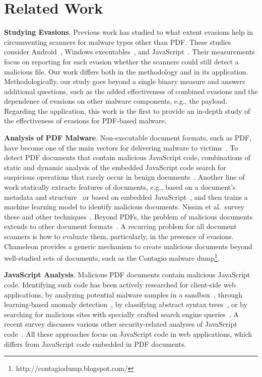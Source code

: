 \section{Related Work}
\label{ss: related work}

\textbf{Studying Evasions}.
Previous work has studied to what extent evasions help in circumventing scanners for malware types other than PDF.
These studies consider Android~\cite{zheng2012adam,faruki2014evaluation,rastogi2013droidchameleon,fedler2013effectiveness,petsas2014rage,canfora2015obfuscation}, Windows executables~\cite{christodorescu2004testing,moser2007limits}, and JavaScript~\cite{Xu2012a}.
Their measurements focus on reporting for each evasion whether the scanners could still detect a malicious file.
Our work differs both in the methodology and in its application.
Methodologically, our study goes beyond a single binary measure and answers additional questions, such as the added effectiveness of combined evasions and the dependence of evasions on other malware components, e.g., the payload.
Regarding the application, this work is the first to provide an in-depth study of the effectiveness of evasions for PDF-based malware.

\textbf{Analysis of PDF Malware}.
Non-executable document formats, such as PDF, have become one of the main vectors for delivering malware to victims~\cite{hardy2014targeted}.
To detect PDF documents that contain malicious JavaScript code, combinations of static and dynamic analysis of the embedded JavaScript code search for suspicious operations that rarely occur in benign documents~\cite{liu2014detecting,schmitt2012pdf,tzermias2011combining,lu2013obfuscation}.
Another line of work statically extracts features of documents, e.g., based on a document's metadata and structure~\cite{smutz2012malicious,maiorca2012pattern,vsrndic2013detection} or based on embedded JavaScript~\cite{laskov2011static,corona2014lux0r}, and then trains a machine learning model to identify malicious documents.
Nissim et al.\ survey these and other techniques~\cite{nissim2015detection}.
Beyond PDFs, the problem of malicious documents extends to other document formats~\cite{nissim2017aldocx}. 
A recurring problem for all document scanners is how to evaluate them, particularly, in the presence of evasions.
Chameleon provides a generic mechanism to create malicious documents beyond well-studied sets of documents, such as the Contagio malware dump\footnote{http://contagiodump.blogspot.com/}.


\textbf{JavaScript Analysis}.
Malicious PDF documents contain malicious JavaScript code.
Identifying such code has been actively researched for client-side web applications, by analyzing potential malware samples in a sandbox~\cite{willems2007toward}, through learning-based anomaly detection~\cite{cova2010detection}, by classifying abstract syntax trees~\cite{curtsinger2011zozzle}, or by searching for malicious sites with specially crafted search engine queries~\cite{invernizzi2012evilseed}.
A recent survey discusses various other security-related analyses of JavaScript code~\cite{jsSurvey2017}.
All these approaches focus on JavaScript code in web applications, which differs from JavaScript code embedded in PDF documents.


